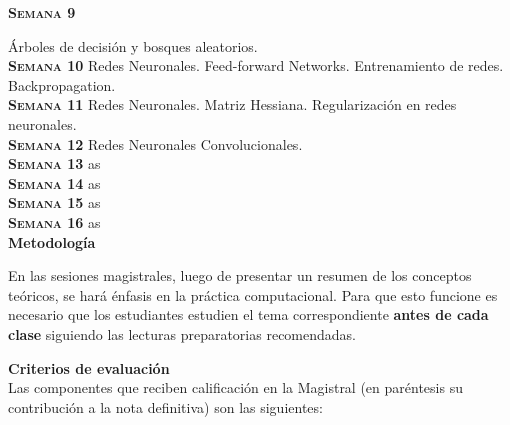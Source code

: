 \documentclass[letterpaper,10pt,onecolumn]{article}
\begin{document}
\noindent\textbf{\textsc{Semana 9}}

\'Arboles de decisi\'on y bosques aleatorios.
\\[-0.3cm] %

\noindent\textbf{\textsc{Semana 10}}
Redes Neuronales. Feed-forward Networks. Entrenamiento de redes.
Backpropagation. %
\\[-0.3cm]

\noindent\textbf{\textsc{Semana 11}}
Redes Neuronales. Matriz Hessiana. Regularizaci\'on en redes
neuronales. 
\\[-0.3cm]


\noindent\textbf{\textsc{Semana 12}}
Redes Neuronales Convolucionales.
\\[-0.3cm]

\noindent\textbf{\textsc{Semana 13}}
as
\\[-0.3cm]


\noindent\textbf{\textsc{Semana 14}}
as
\\[-0.3cm]

\noindent\textbf{\textsc{Semana 15}}
as
\\[-0.3cm]

\noindent\textbf{\textsc{Semana 16}}
as
\\[0.1cm]


\vspace*{0.5cm} 
\noindent\textbf{\large {} \quad
  Metodolog\'ia}\\[-0.2cm] 


\noindent\normalsize 

En las sesiones magistrales, luego de presentar un resumen de
los conceptos te\'oricos, se har\'a \'enfasis en la pr\'actica computacional.
Para que esto funcione es necesario que los estudiantes estudien el
tema correspondiente {\bf antes de cada clase} siguiendo las lecturas
preparatorias recomendadas.

\vspace*{0.5cm} 
\noindent\textbf{\large {} \quad Criterios de
  evaluaci\'on}\\[-0.2cm] 

Las componentes que reciben calificaci\'on en la Magistral (en
par\'entesis su contribuci\'on a la nota definitiva) son las
siguientes:  
\end{document}
